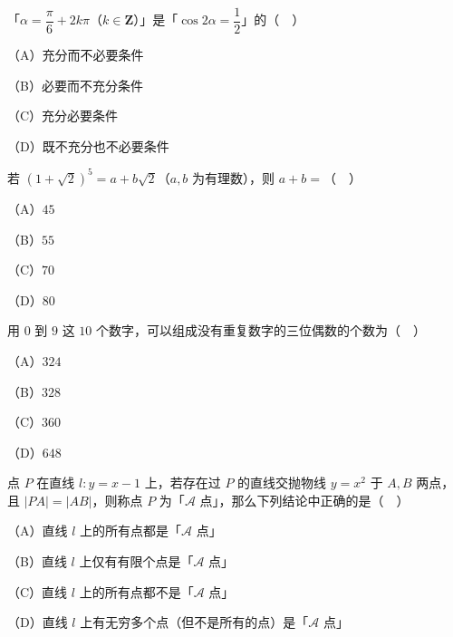 \begin{question}
「$\alpha=\dfrac{\pi}{6}+2k\pi$（$k\in\mathbf Z$）」是「$\cos2\alpha=\dfrac12$」的（　）

（A）充分而不必要条件

（B）必要而不充分条件

（C）充分必要条件

（D）既不充分也不必要条件

\end{question}
\begin{question}
若 $(1+\sqrt2)^5=a+b\sqrt2$（$a,b$ 为有理数），则 $a+b=$（　）

（A）$45$

（B）$55$

（C）$70$

（D）$80$

\end{question}
\begin{question}
用 $0$ 到 $9$ 这 $10$ 个数字，可以组成没有重复数字的三位偶数的个数为（　）

（A）$324$

（B）$328$

（C）$360$

（D）$648$

\end{question}
\begin{question}
点 $P$ 在直线 $l:y=x-1$ 上，若存在过 $P$ 的直线交抛物线 $y=x^2$ 于 $A,B$ 两点，且 $|PA|=|AB|$，则称点 $P$ 为「$\mathcal A$ 点」，那么下列结论中正确的是（　）

（A）直线 $l$ 上的所有点都是「$\mathcal A$ 点」

（B）直线 $l$ 上仅有有限个点是「$\mathcal A$ 点」

（C）直线 $l$ 上的所有点都不是「$\mathcal A$ 点」

（D）直线 $l$ 上有无穷多个点（但不是所有的点）是「$\mathcal A$ 点」

\end{question}

